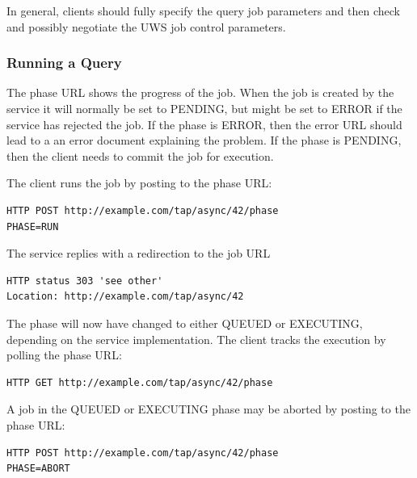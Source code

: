 \documentclass[11pt,letter]{ivoa}
\begin{document}
In general, clients should fully specify the query job parameters and then 
check and possibly negotiate the UWS job control parameters.

\subsubsection{Running a Query}
The phase URL shows the progress of the job. When the job is created by the 
service it will normally be set to PENDING, but might be set to ERROR if the 
service has rejected the job. If the phase is ERROR, then the error URL should 
lead to a an error document explaining the problem. If the phase is PENDING, 
then the client needs to commit the job for execution.

The client runs the job by posting to the phase URL:
\begin{verbatim}
HTTP POST http://example.com/tap/async/42/phase
PHASE=RUN
\end{verbatim}

The service replies with a redirection to the job URL
\begin{verbatim}
HTTP status 303 'see other'
Location: http://example.com/tap/async/42
\end{verbatim}
The phase will now have changed to either QUEUED or EXECUTING, depending on the 
service implementation. The client tracks the execution by polling the phase 
URL:
\begin{verbatim}
HTTP GET http://example.com/tap/async/42/phase
\end{verbatim}
A job in the  QUEUED or EXECUTING phase may be aborted by posting to the phase 
URL:
\begin{verbatim}
HTTP POST http://example.com/tap/async/42/phase
PHASE=ABORT
\end{verbatim}
\end{document}

